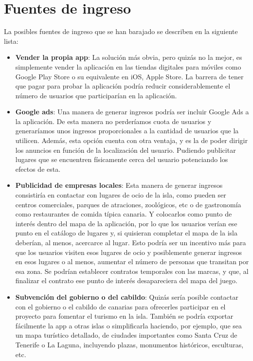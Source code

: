 \documentclass{report}
\begin{document}
\section{Fuentes de ingreso}
La posibles fuentes de ingreso que se han barajado se describen en la siguiente lista:
\begin{itemize}
\item \textbf{Vender la propia app}: La solución más obvia, pero quizás no la mejor, es simplemente vender la aplicación en las tiendas digitales para móviles como Google Play Store o su equivalente en iOS, Apple Store. La barrera de tener que pagar para probar la aplicación podría reducir considerablemente el número de usuarios que participarían en la aplicación.

\item \textbf{Google ads}: Una manera de generar ingresos podría ser incluir Google Ads a la aplicación. De esta manera no perderíamos cuota de usuarios y generaríamos unos ingresos proporcionales a la cantidad de usuarios que la utilicen. Además, esta opción cuenta con otra ventaja, y es la de poder dirigir los anuncios en función de la localización del usuario. Pudiendo publicitar lugares que se encuentren físicamente cerca del usuario potenciando los efectos de esta.

\item \textbf{Publicidad de empresas locales}: Esta manera de generar ingresos consistiría en contactar con lugares de ocio de la isla, como pueden ser centros comerciales, parques de atraciones, zoológicos, etc o de gastronomía como restaurantes de comida típica canaria. Y colocarlos como punto de interés dentro del mapa de la aplicación, por lo que los usuarios verían ese punto en el catálogo de lugares y, si quisieran completar el mapa de la isla deberían, al menos, acercarce al lugar. Esto podría ser un incentivo más para que los usuarios visiten esos lugares de ocio y posiblemente generar ingresos en esos lugares o al menos, aumentar el número de personas que transitan por esa zona. Se podrían establecer contratos temporales con las marcas, y que, al finalizar el contrato ese punto de interés desapareciera del mapa del juego.

\item \textbf{Subvención del gobierno o del cabildo}: Quizás sería posible contactar con el gobierno o el cabildo de canarias para ofrecerles participar en el proyecto para fomentar el turismo en la isla. También se podría exportar fácilmente la app a otras islas o simplificarla haciendo, por ejemplo, que sea un mapa turístico detallado, de ciudades importantes como Santa Cruz de Tenerife o La Laguna, incluyendo plazas, monumentos históricos, esculturas, etc.
\end{itemize}
\end{document}
